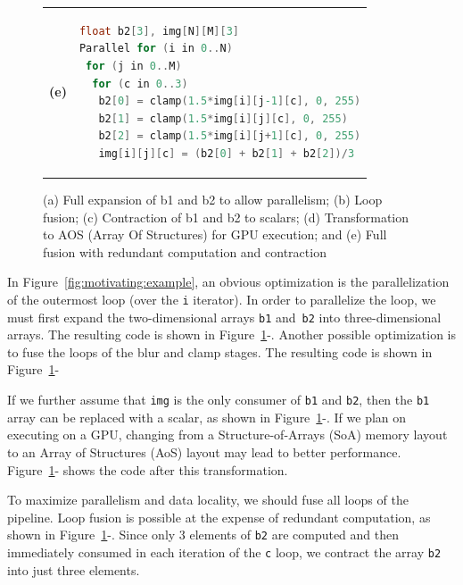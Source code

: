 \begin{figure}[t!]
\begin{tabular}{cl}
\\\hline

{\textbf{\normalsize(e)}} & 
\begin{lstlisting}[language=C,escapechar=@]
float b2[3], img[N][M][3]
Parallel for (i in 0..N)
 for (j in 0..M)
  for (c in 0..3)
   b2[0] = clamp(1.5*img[i][j-1][c], 0, 255)
   b2[1] = clamp(1.5*img[i][j][c], 0, 255)
   b2[2] = clamp(1.5*img[i][j+1][c], 0, 255)
   img[i][j][c] = (b2[0] + b2[1] + b2[2])/3
\end{lstlisting}

\\

\end{tabular}

\caption{
(a) Full expansion of b1 and b2 to allow parallelism;
(b) Loop fusion;
(c) Contraction of b1 and b2 to scalars;
(d) Transformation to AOS (Array Of Structures) for GPU execution; and
(e) Full fusion with redundant computation and contraction}
\label{fig:example-ir}

\end{figure}

In Figure~\ref{fig:motivating:example}, an obvious optimization is the parallelization of the outermost loop (over the \lstinline{i} iterator).  In order to parallelize the loop, we must first expand the two-dimensional arrays \lstinline{b1} and~\lstinline{b2} into three-dimensional arrays.  The resulting code is shown in Figure~\ref{fig:example-ir}-\codeone{}.  Another possible optimization is to fuse the loops of the blur and clamp stages.  The resulting code is shown in Figure~\ref{fig:example-ir}-\codetwo{}

If we further assume that \lstinline{img} is the only consumer of \lstinline{b1} and \lstinline{b2}, then the \lstinline{b1} array can be replaced with a scalar, as shown in Figure~\ref{fig:example-ir}-\codethree{}.  If we plan on executing on a GPU, changing from a Structure-of-Arrays (SoA) memory layout to an Array of Structures (AoS) layout may lead to better performance.  Figure~\ref{fig:example-ir}-\codefour{} shows the code after this transformation.

To maximize parallelism and data locality, we should fuse all loops of the pipeline.  Loop fusion is possible at the expense of redundant computation, as shown in Figure~\ref{fig:example-ir}-\codefive{}.  Since only 3 elements of \lstinline{b2} are computed and then immediately consumed in each iteration of the \lstinline{c} loop, we contract the array \lstinline{b2} into just three elements.

